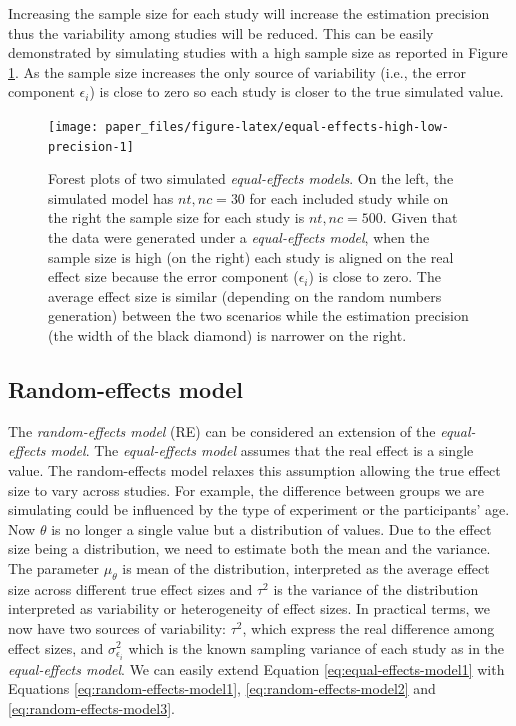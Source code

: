 \documentclass[
  man,floatsintext]{apa6}
\begin{document}
\normalsize

Increasing the sample size for each study will increase the estimation precision thus the variability among studies will be reduced. This can be easily demonstrated by simulating studies with a high sample size as reported in Figure \ref{fig:equal-effects-high-low-precision}. As the sample size increases the only source of variability (i.e., the error component \(\epsilon_{i}\)) is close to zero so each study is closer to the true simulated value.

\scriptsize

\begin{figure}[H]

{\centering \texttt{[image: paper\_files/figure-latex/equal-effects-high-low-precision-1]} 

}

\caption{Forest plots of two simulated \emph{equal-effects models}. On the left, the simulated model has \(nt,nc = 30\) for each included study while on the right the sample size for each study is \(nt,nc = 500\). Given that the data were generated under a \emph{equal-effects model}, when the sample size is high (on the right) each study is aligned on the real effect size because the error component (\(\epsilon_{i}\)) is close to zero. The average effect size is similar (depending on the random numbers generation) between the two scenarios while the estimation precision (the width of the black diamond) is narrower on the right.}\label{fig:equal-effects-high-low-precision}
\end{figure}

\normalsize

\hypertarget{re-model}{%
\subsection{Random-effects model}\label{re-model}}

The \emph{random-effects model} (RE) can be considered an extension of the \emph{equal-effects model}. The \emph{equal-effects model} assumes that the real effect is a single value. The random-effects model relaxes this assumption allowing the true effect size to vary across studies. For example, the difference between groups we are simulating could be influenced by the type of experiment or the participants' age.
Now \(\theta\) is no longer a single value but a distribution of values. Due to the effect size being a distribution, we need to estimate both the mean and the variance. The parameter \(\mu_{\theta}\) is mean of the distribution, interpreted as the average effect size across different true effect sizes and \(\tau^{2}\) is the variance of the distribution interpreted as variability or heterogeneity of effect sizes. In practical terms, we now have two sources of variability: \(\tau^{2}\), which express the real difference among effect sizes, and \(\sigma_{\epsilon_i}^{2}\) which is the known sampling variance of each study as in the \emph{equal-effects model}. We can easily extend Equation \eqref{eq:equal-effects-model1} with Equations \eqref{eq:random-effects-model1}, \eqref{eq:random-effects-model2} and \eqref{eq:random-effects-model3}.
\end{document}
